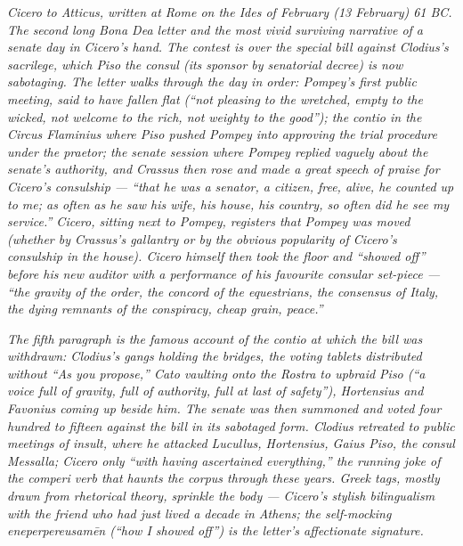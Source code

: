 
\textit{Cicero to Atticus, written at Rome on the Ides of
February (13 February) 61 BC. The second long Bona Dea
letter and the most vivid surviving narrative of a senate
day in Cicero's hand. The contest is over the special
bill against Clodius's sacrilege, which Piso the consul
(its sponsor by senatorial decree) is now sabotaging. The
letter walks through the day in order: Pompey's first
public meeting, said to have fallen flat (``not pleasing
to the wretched, empty to the wicked, not welcome to the
rich, not weighty to the good''); the contio in the Circus
Flaminius where Piso pushed Pompey into approving the
trial procedure under the praetor; the senate session
where Pompey replied vaguely about the senate's authority,
and Crassus then rose and made a great speech of praise
for Cicero's consulship --- ``that he was a senator, a
citizen, free, alive, he counted up to me; as often as he
saw his wife, his house, his country, so often did he see
my service.'' Cicero, sitting next to Pompey, registers
that Pompey was moved (whether by Crassus's gallantry or
by the obvious popularity of Cicero's consulship in the
house). Cicero himself then took the floor and ``showed
off'' before his new auditor with a performance of his
favourite consular set-piece --- ``the gravity of the
order, the concord of the equestrians, the consensus of
Italy, the dying remnants of the conspiracy, cheap grain,
peace.''}

\textit{The fifth paragraph is the famous account of the
contio at which the bill was withdrawn: Clodius's gangs
holding the bridges, the voting tablets distributed
without ``As you propose,'' Cato vaulting onto the Rostra
to upbraid Piso (``a voice full of gravity, full of
authority, full at last of safety''), Hortensius and
Favonius coming up beside him. The senate was then
summoned and voted four hundred to fifteen against the
bill in its sabotaged form. Clodius retreated to public
meetings of insult, where he attacked Lucullus, Hortensius,
Gaius Piso, the consul Messalla; Cicero only ``with having
ascertained everything,'' the running joke of the
\textit{comperi} verb that haunts the corpus through these
years. Greek tags, mostly drawn from rhetorical theory,
sprinkle the body --- Cicero's stylish bilingualism with
the friend who had just lived a decade in Athens; the
self-mocking \textit{eneperpereusam\=en} (``how I showed
off'') is the letter's affectionate signature.}
